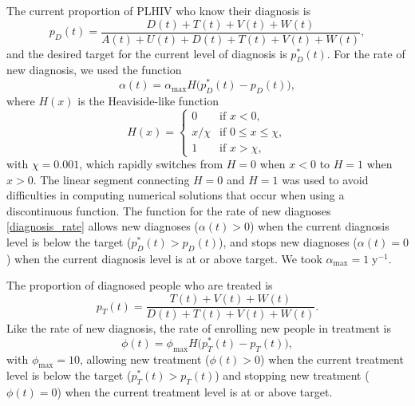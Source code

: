 \documentclass{article}
\begin{document}
The current proportion of PLHIV who know their diagnosis is
\begin{equation}
  p_D(t) = \frac{D(t) + T(t) + V(t) + W(t)}
  {A(t) + U(t) + D(t) + T(t) + V(t) + W(t)},
\end{equation}
and the desired target for the current level of diagnosis is
$p_D^*(t)$.  For the rate of new diagnosis, we used the function
\begin{equation}
  \label{diagnosis_rate}
  \alpha(t) = \alpha_{\max} H\big(p_D^*(t) - p_D(t)\big),
\end{equation}
where $H(x)$ is the Heaviside-like function
\begin{equation}
  H(x) =
  \begin{cases}
    0 & \text{if $x < 0$},
    \\
    x / \chi & \text{if $0 \leq x \leq \chi$},
    \\
    1 & \text{if $x > \chi$},
  \end{cases}
\end{equation}
with $\chi = 0.001$, which rapidly switches from $H = 0$ when $x < 0$
to $H = 1$ when $x > 0$.  The linear segment connecting $H = 0$ and
$H = 1$ was used to avoid difficulties in computing numerical
solutions that occur when using a discontinuous function.  The
function for the rate of new diagnoses \eqref{diagnosis_rate} allows
new diagnoses ($\alpha(t) > 0$) when the current diagnosis level is
below the target ($p_D^*(t) > p_D(t)$), and stops new
diagnoses ($\alpha(t) = 0$) when the current diagnosis level is at or
above target.  We took $\alpha_{\max} = 1\;\text{y$^{-1}$}$.
  
The proportion of diagnosed people who are treated is
\begin{equation}
  p_T(t) = \frac{T(t) + V(t) + W(t)}{D(t) + T(t) + V(t) + W(t)}.
\end{equation}
Like the rate of new diagnosis, the rate of enrolling new people in
treatment is
\begin{equation}
  \label{treatment_rate}
  \phi(t) = \phi_{\max} H\big(p_T^*(t) - p_T(t)\big),
\end{equation}
with $\phi_{\max} = 10$, allowing new treatment ($\phi(t) > 0$) when
the current treatment level is below the target ($p_T^*(t) > p_T(t)$)
and stopping new treatment ($\phi(t) = 0$) when the current treatment
level is at or above target.
\end{document}
